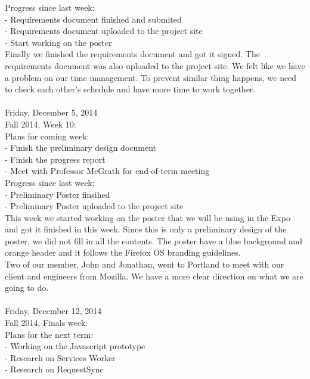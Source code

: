 {Progress since last week: \\
- Requirements document finished and submited \\
- Requirements document uploaded to the project site \\
- Start working on the poster \\

Finally we finished the requirements document and got it signed. The requirements document was also uploaded to the project site. We felt like we have a problem on our time management. To prevent similar thing happens, we need to check each other’s schedule and have more time to work together. \\

\hrulefill \\
Friday, December 5, 2014 \\
Fall 2014, Week 10: \\

Plans for coming week: \\
- Finish the preliminary design document \\
- Finish the progress report \\
- Meet with Professor McGrath for end-of-term meeting \\

Progress since last week: \\
- Preliminary Poster finsihed \\
- Preliminary Poster uploaded to the project site \\

This week we started working on the poster that we will be using in the Expo and got it finished in this week. Since this is only a preliminary design of the poster, we did not fill in all the contents. The poster have a blue background and orange header and it follows the Firefox OS branding guidelines. \\

Two of our member, John and Jonathan, went to Portland to meet with our client and engineers from Mozilla. We have a more clear direction on what we are going to do. \\

\hrulefill \\
Friday, December 12, 2014 \\
Fall 2014, Finals week: \\

Plans for the next term: \\
- Working on the Javascript prototype \\
- Research on Services Worker \\
- Research on RequestSync \\

}
